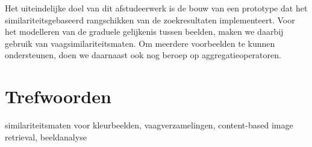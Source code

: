Het uiteindelijke doel van dit afstudeerwerk is de bouw van een prototype dat
het similariteitsgebaseerd rangschikken van de zoekresultaten implementeert.
Voor het modelleren van de graduele gelijkenis tussen beelden, maken we daarbij gebruik van 
vaagsimilariteitsmaten. Om meerdere voorbeelden te kunnen ondersteunen, doen we 
daarnaast ook nog beroep op aggregatieoperatoren.

\section*{Trefwoorden}
similariteitsmaten voor kleurbeelden, vaagverzamelingen, content-based image retrieval, 
beeld\-analyse

